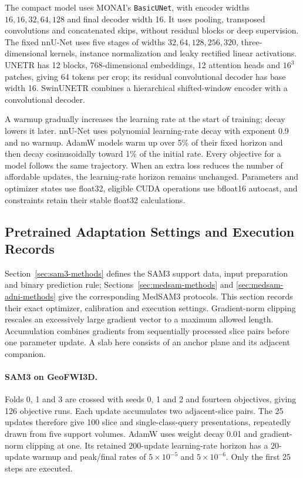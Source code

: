 \documentclass[12pt,a4paper]{article}
\begin{document}
The compact model uses MONAI's \texttt{BasicUNet}, with encoder widths
$16,16,32,64,128$ and final decoder width 16. It uses pooling, transposed
convolutions and concatenated skips, without residual blocks or deep
supervision. The fixed nnU-Net uses five stages of widths
$32,64,128,256,320$, three-dimensional kernels, instance normalization and
leaky rectified linear activations. UNETR has 12 blocks, 768-dimensional
embeddings, 12 attention heads and $16^3$ patches, giving 64 tokens per
crop; its residual convolutional decoder has base width 16. SwinUNETR
combines a hierarchical shifted-window encoder with a convolutional decoder.


A warmup gradually increases the learning rate at the start of training;
decay lowers it later. nnU-Net uses polynomial learning-rate decay with
exponent 0.9 and no warmup. AdamW models warm up over 5\% of their fixed horizon and then
decay cosinusoidally toward 1\% of the initial rate. Every objective
for a model follows the same trajectory. When an extra loss reduces
the number of affordable updates, the learning-rate horizon remains
unchanged. Parameters and optimizer states use float32, eligible CUDA
operations use bfloat16 autocast, and constraints retain their stable
float32 calculations.

\subsection{Pretrained Adaptation Settings and Execution Records}
\label{sec:adaptation-implementation}

Section~\ref{sec:sam3-methods} defines the SAM3 support data, input
preparation and binary prediction rule; Sections~\ref{sec:medsam-methods}
and \ref{sec:medsam-adni-methods} give the corresponding MedSAM3 protocols.
This section records their exact optimizer, calibration and execution
settings. Gradient-norm clipping rescales an excessively large gradient
vector to a maximum allowed length. Accumulation combines gradients from
sequentially processed slice pairs before one parameter update. A slab here
consists of an anchor plane and its adjacent companion.

\paragraph{SAM3 on GeoFWI3D.}\label{sec:sam3-methods-details}
Folds 0, 1 and 3 are crossed with seeds 0, 1 and 2 and fourteen
objectives, giving 126 objective runs. Each update accumulates two
adjacent-slice pairs. The 25 updates therefore give 100 slice and
single-class-query presentations, repeatedly drawn from five support
volumes. AdamW uses weight decay 0.01 and gradient-norm clipping at
one. Its retained 200-update learning-rate horizon has a 20-update
warmup and peak/final rates of $5\times10^{-5}$ and $5\times10^{-6}$.
Only the first 25 steps are executed.
\end{document}
